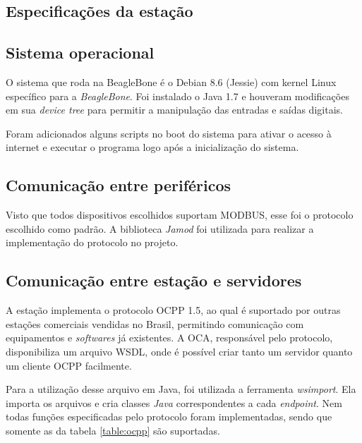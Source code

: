     \subsection{Especificações da estação}


    \subsection{Sistema operacional}

      O sistema que roda na BeagleBone é o Debian 8.6 (Jessie) com kernel Linux específico para a \textit{BeagleBone}. Foi instalado o Java 1.7 e houveram modificações em sua \textit{device tree} para permitir a manipulação das entradas e saídas digitais.

      Foram adicionados alguns scripts no boot do sistema para ativar o acesso à internet e executar o programa logo após a inicialização do sistema.

    \subsection{Comunicação entre periféricos}

      Visto que todos dispositivos escolhidos suportam MODBUS, esse foi o protocolo escolhido como padrão. A biblioteca \textit{Jamod} foi utilizada para realizar a implementação do protocolo no projeto.

    \subsection{Comunicação entre estação e servidores}

      A estação implementa o protocolo \ac{OCPP} 1.5, ao qual é suportado por outras estações comerciais vendidas no Brasil, permitindo comunicação com equipamentos e \textit{softwares} já existentes. A \ac{OCA}, responsável pelo protocolo, disponibiliza um arquivo WSDL, onde é possível criar tanto um servidor quanto um cliente OCPP facilmente.

      Para a utilização desse arquivo em Java, foi utilizada a ferramenta \textit{wsimport}. Ela importa os arquivos e cria classes \textit{Java} correspondentes a cada \textit{endpoint}. Nem todas funções especificadas pelo protocolo foram implementadas, sendo que somente as da tabela \ref{table:ocpp} são suportadas.


